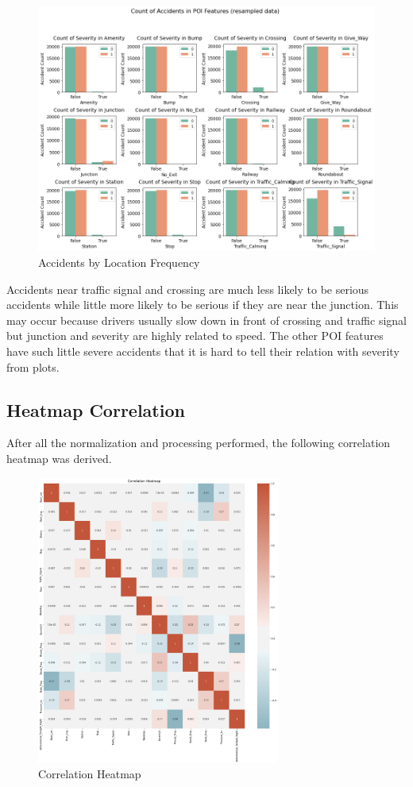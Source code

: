 \begin{figure}[H]
    \centering
    \includegraphics[width=130mm,height=\textheight,keepaspectratio]{images/accidents_poi.png}
    \caption{Accidents by Location Frequency}
    \label{fig:accidents_poi}
\end{figure}

Accidents near traffic signal and crossing are much less likely to be serious accidents while little more likely to be serious if they are near the junction. This may occur because drivers usually slow down in front of crossing and traffic signal but junction and severity are highly related to speed. The other POI features have such little severe accidents that it is hard to tell their relation with severity from plots.

\subsection{Heatmap Correlation}
After all the normalization and processing performed, the following correlation heatmap was derived.

\begin{figure}[H]
    \centering
    \includegraphics[width=80mm,height=\textheight,keepaspectratio]{images/corr_heatmap.png}
    \caption{Correlation Heatmap}
    \label{fig:corr_heatmap}
\end{figure}

